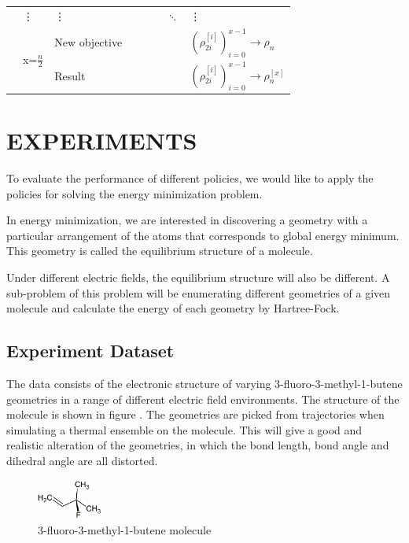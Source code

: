 \documentclass[twoside]{article}
\begin{document}
\begin{center}
\begin{table}[t]
\begin{tabular}{|l|l|l|l|l|l|l|l|}
	& \vdots      & \vdots      &                &                &                & $\ddots$ &   \vdots \\ \cline{2-8} 
	& \multirow{2}{*}{ x=$\frac{n}{2}$} & New objective         &                         &                          &                            &  & $(\rho_{2i}^{[i]})_{i=0}^{x-1} \rightarrow \rho_{n}$     \\ \cline{3-8} 
	&                & Result  &                &                &                &  & $(\rho_{2i}^{[i]})_{i=0}^{x-1}\rightarrow \rho_{n}^{[x]}$ \\ \hline
	\end{tabular}
	\end{table}
\end{center} 



\section{EXPERIMENTS}

To evaluate the performance of different policies, we would like to apply the policies for solving the energy minimization problem.

In energy minimization, we are interested in discovering a geometry with a particular arrangement of the atoms that corresponds to global energy minimum. This geometry is called the equilibrium structure of a molecule.

Under different electric fields, the equilibrium structure will also be different. A sub-problem of this problem will be enumerating different geometries of a given molecule and calculate the energy of each geometry by Hartree-Fock. 

 
\subsection{Experiment Dataset}

The data consists of the electronic structure of varying 3-fluoro-3-methyl-1-butene geometries in a range of different electric field environments. The structure of the molecule is shown in figure \cite{fig:molecule}. The geometries are picked from trajectories when simulating a thermal ensemble on the molecule. This will give a good and realistic alteration of the geometries, in which the bond length, bond angle and dihedral angle are all distorted. 

\begin{figure}[h!]

  \caption{3-fluoro-3-methyl-1-butene molecule}
  \label{fig:molecule}
    \centerline{\includegraphics[width=80px]{3-fluoro-3-methyl-1-butene.png}}
\end{figure}
\end{document}
